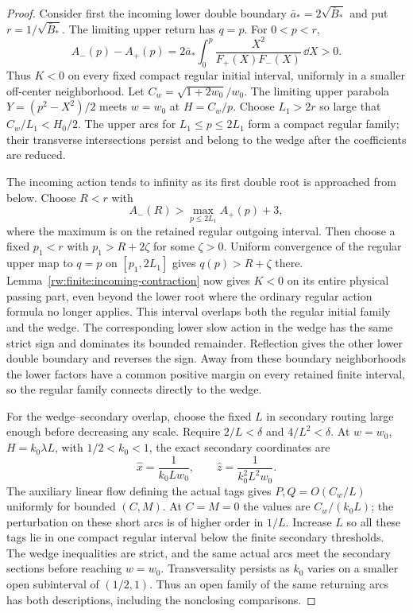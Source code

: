\begin{proof}
Consider first the incoming lower double boundary
$\bar a_*=2\sqrt{\bar B_*}$ and put
$r=1/\sqrt{\bar B_*}$. The limiting upper return has $q=p$.
For $0<p<r$,
\[
 A_-(p)-A_+(p)
 =2\bar a_*\int_0^p
               \frac{X^2}{F_+(X)F_-(X)}\,\dd X>0.
\]
Thus $K<0$ on every fixed compact regular initial interval,
uniformly in a smaller off-center neighborhood.
Let $C_w=\sqrt{1+2w_0}/w_0$. The limiting upper parabola
$Y=(p^2-X^2)/2$ meets $w=w_0$ at $H=C_w/p$.
Choose $L_1>2r$ so large that $C_w/L_1<H_0/2$.
The upper arcs for $L_1\le p\le2L_1$ form a compact regular
family; their transverse intersections persist and belong to
the wedge after the coefficients are reduced.

The incoming action tends to infinity as its first double root
is approached from below. Choose $R<r$ with
\[
 A_-(R)>\max_{p\le2L_1}A_+(p)+3,
\]
where the maximum is on the retained regular outgoing interval.
Then choose a fixed $p_1<r$ with $p_1>R+2\zeta$ for some
$\zeta>0$. Uniform convergence of the regular upper map to
$q=p$ on $[p_1,2L_1]$ gives $q(p)>R+\zeta$ there.
Lemma~\ref{rw:finite:incoming-contraction} now gives $K<0$
on its entire physical passing part, even beyond the lower
root where the ordinary regular action formula no longer applies.
This interval overlaps both the regular initial family and the
wedge. The corresponding lower slow action in the wedge has
the same strict sign and dominates its bounded remainder.
Reflection gives the other lower double boundary and reverses
the sign. Away from these boundary neighborhoods the lower
factors have a common positive margin on every retained finite
interval, so the regular family connects directly to the wedge.

For the wedge--secondary overlap, choose the fixed $L$ in secondary
routing large enough before decreasing any scale. Require
$2/L<\delta$ and $4/L^2<\delta$. At
$w=w_0$, $H=k_0\lambda L$, with $1/2<k_0<1$, the exact
secondary coordinates are
\[
 \widehat x=\frac1{k_0Lw_0},\qquad
 \widehat z=\frac1{k_0^2L^2w_0}.
\]
The auxiliary linear flow defining the actual tags gives
$P,Q=O(C_w/L)$ uniformly for bounded $(C,M)$.
At $C=M=0$ the values are $C_w/(k_0L)$; the perturbation
on these short arcs is of higher order in $1/L$.
Increase $L$ so all these tags lie in one compact regular
interval below the finite secondary thresholds.
The wedge inequalities are strict, and the same actual arcs
meet the secondary sections before reaching $w=w_0$.
Transversality persists as $k_0$ varies on a smaller open subinterval
of $(1/2,1)$. Thus an open family of the same returning arcs has both
descriptions, including the nonclosing comparisons.
\end{proof}

